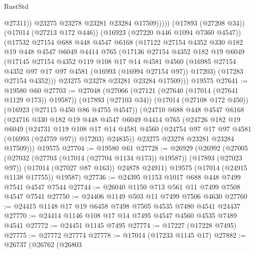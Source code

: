 \begin{lexlean}{RustStd}
\begin{coremodule}
{\begin{coremodule}
{{{{{{{{{{{{{{{{{{{{{{{{{{{{{{{{{{{{{{{{{{{{{{{{{{{{{{{                    @27311))
                @23275
                @23278
                @23281
                @23284
                @17509)))))
      (@17893 (@27208 @34))
      (@17014 (@27213 @172 @446))
      (@16923 (@27220 @446 @1094 @7360 @4547))
      (@17532
        @27154
        @688
        @448
        @4547
        @6168
        (@17122
          @27154
          @4352
          @330
          @182
          @19
          @448
          @4547
          @6049
          @4414
          @765
          (@17136
            @27154
            @4352
            @182
            @19
            @6049
            (@17145
              @27154
              @4352
              @119
              @108
              @17
              @14
              @4581
              @4560
              (@16985 @27154 @4352 @97 @17 @97 @4581 (@16993 (@16994 @27154 @97)) @17203)
              (@17283 @27154 @4352)))
          @23275
          @23278
          @23281
          @23284
          @17509)))
    @19575
@27641 := @19580 @60
@27703 := @27048
    (@27066
      (@27121 (@27640 (@17014 (@27641 @1129 @173)) @19587))
      (@17893 (@27103 @34))
      (@17014 (@27108 @172 @450))
      (@16923 (@27115 @450 @86 @4755 @4547))
      (@24710
        @688
        @448
        @4547
        @6168
        (@24716
          @330
          @182
          @19
          @448
          @4547
          @6049
          @4414
          @765
          (@24726
            @182
            @19
            @6049
            (@24731
              @119
              @108
              @17
              @14
              @4581
              @4560
              (@24754 @97 @17 @97 @4581 (@16993 (@24759 @97)) @17203)
              @24835))
          @23275
          @23278
          @23281
          @23284
          @17509)))
    @19575
@27704 := @19580 @61
@27728 := @26929
    (@26992
      (@27005
        (@27032 (@27703 (@17014 (@27704 @1134 @173)) @19587))
        (@17893 (@27023 @97))
        (@17014 (@27027 @87 @163))
        @24878
        @24911)
      @19575
      (@17014 (@24915 @1138 @17755))
      @19587)
@27736 := @24395 @1153 @1017 @688 @448 @7499 @7541 @4547 @7544
@27744 := @26040 @1150 @713 @561 @11 @7499 @7508 @4547 @7541
@27750 := @24406 @1149 @503 @11 @7499 @7506 @4630
@27760 := @24415 @1148 @17 @19 @6458 @7498 @7505 @4535 @7480 @4541 @24437
@27770 := @24414 @1146 @108 @17 @14 @7495 @4547 @4560 @4535 @7489 @4541
@27772 := @24451 @1145 @7495
@27774 := @17227 (@17228 @7495)
@27775 := @27772 @27774
@27778 := @17014 (@17233 @1145 @17)
@27882 := @26737
    (@26762
      (@26803
}}}}}}}}}}}}}}}}}}}}}}}}}}}}}}}}}}}}}}}}}}}}}}}}}}}}}}}
\end{coremodule}}
\end{coremodule}
\end{lexlean}
